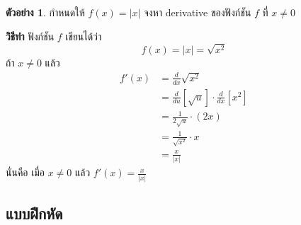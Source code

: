 \documentclass[
]{book}
\theoremstyle{definition}
\theoremstyle{definition}
\newtheorem{example}{ตัวอย่าง}[chapter]
\theoremstyle{definition}
\theoremstyle{definition}
\theoremstyle{remark}
\begin{document}
\begin{example}
กำหนดให้ \(f(x) = |x|\) จงหา derivative ของฟังก์ชัน \(f\) ที่ \(x \ne 0\)
\end{example}

\textbf{วิธีทำ} ฟังก์ชัน \(f\) เขียนได้ว่า \[f(x) = |x| = \sqrt{x^2}\] ถ้า \(x\ne 0\) แล้ว
\begin{equation}   \begin{aligned}
    f'(x) &= \frac{d}{dx} \sqrt{x^2} \\
          &= \frac{d}{du} [\sqrt{u}] \cdot \frac{d}{dx} [x^2] \\
          &= \frac{1}{2\sqrt{u}} \cdot (2x) \\
          &= \frac{1}{\sqrt{x^2}} \cdot x \\
          &= \frac{x}{|x|}
  \end{aligned} \end{equation} นั่นคือ เมื่อ \(x\ne 0\) แล้ว
\(\displaystyle f'(x) = \frac{x}{|x|}\)

\subsection{แบบฝึกหัด}\label{uxe41uxe1auxe1auxe1duxe01uxe2buxe14}
\end{document}
